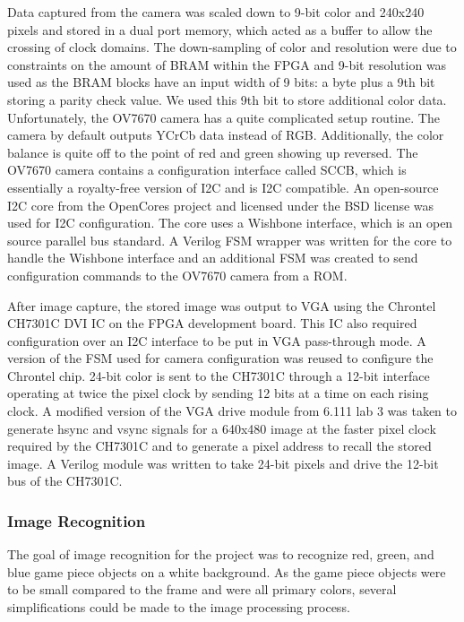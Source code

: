 \documentclass{article}
\begin{document}
 Data captured from the camera was scaled down to 9-bit color and 240x240 pixels and stored in a dual port memory, which acted as a buffer to allow the crossing of clock domains. The down-sampling of color and resolution were due to constraints on the amount of BRAM within the FPGA and 9-bit resolution was used as the BRAM blocks have an input width of 9 bits: a byte plus a 9th bit storing a parity check value. We used this 9th bit to store additional color data. 
Unfortunately, the OV7670 camera has a quite complicated setup routine. The camera by default outputs YCrCb data instead of RGB. Additionally, the color balance is quite off to the point of red and green showing up reversed. The OV7670 camera contains a configuration interface called SCCB, which is essentially a royalty-free version of I2C and is I2C compatible. An open-source I2C core from the OpenCores project and licensed under the BSD license was used for I2C configuration. The core uses a Wishbone interface, which is an open source parallel bus standard. A Verilog FSM wrapper was written for the core to handle the Wishbone interface and an additional FSM was created to send configuration commands to the OV7670 camera from a ROM.

After image capture, the stored image was output to VGA using the Chrontel CH7301C DVI IC on the FPGA development board. This IC also required configuration over an I2C interface to be put in VGA pass-through mode. A version of the FSM used for camera configuration was reused to configure the Chrontel chip. 24-bit color is sent to the CH7301C through a 12-bit interface operating at twice the pixel clock by sending 12 bits at a time on each rising clock. A modified version of the VGA drive module from 6.111 lab 3 was taken to generate hsync and vsync signals for a 640x480 image at the faster pixel clock required by the CH7301C and to generate a pixel address to recall the stored image. A Verilog module was written to take 24-bit pixels and drive the 12-bit bus of the CH7301C.
	
\subsubsection{Image Recognition} \label{imagerec}

The goal of image recognition for the project was to recognize red, green, and blue game piece objects on a white background. As the game piece objects were to be small compared to the frame and were all primary colors, several simplifications could be made to the image processing process.
\end{document}
